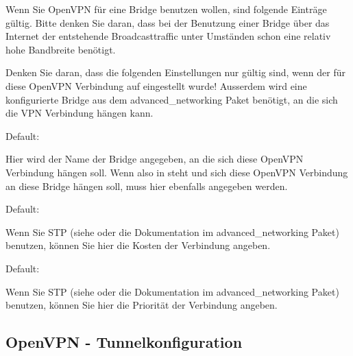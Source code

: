  Wenn Sie OpenVPN für eine Bridge benutzen wollen, sind folgende
  Einträge gültig. Bitte denken Sie daran, dass bei der Benutzung
  einer Bridge über das Internet der entstehende Broadcasttraffic
  unter Umständen schon eine relativ hohe Bandbreite benötigt.

  Denken Sie daran, dass die folgenden Einstellungen nur gültig sind,
  wenn der  für diese OpenVPN
  Verbindung auf  eingestellt wurde! Ausserdem wird eine
  konfigurierte Bridge aus dem advanced\_networking Paket benötigt, an
  die sich die VPN Verbindung hängen kann.

\begin{description}


  Default: 

  Hier wird der Name der Bridge angegeben, an die sich diese OpenVPN
  Verbindung hängen soll.  Wenn also in
   steht und sich diese OpenVPN
  Verbindung an diese Bridge hängen soll, muss hier ebenfalls
   angegeben werden.


  Default: 

  Wenn Sie STP (siehe
   oder die
  Dokumentation im advanced\_networking Paket) benutzen, können Sie
  hier die Kosten der Verbindung angeben.


  Default: 

  Wenn Sie STP (siehe
   oder die
  Dokumentation im advanced\_networking Paket) benutzen, können Sie
  hier die Priorität der Verbindung angeben.

\end{description}

\subsection{OpenVPN - Tunnelkonfiguration}

